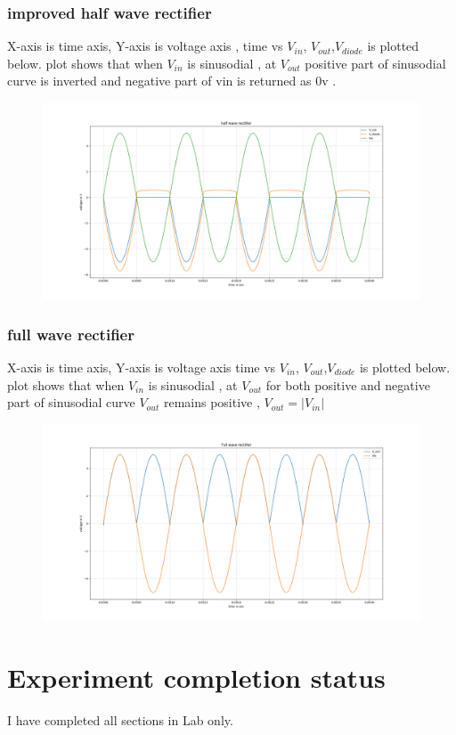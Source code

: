 \documentclass[12pt]{article}
\begin{document}
\subsubsection{improved half wave rectifier}
X-axis is time axis, Y-axis is voltage axis , time vs \(V_{in}\), \(V_{out}\),\(V_{diode}\) is plotted below. plot shows that when \(V_{in}\) is sinusodial , at \(V_{out}\) positive part of sinusodial curve is inverted and negative part of vin is returned as 0v .\\
\begin{figure}[h!]
\centering
\includegraphics[scale = 0.4]{improved_half_wave_rectifier_plot.png}
\end{figure}
\newpage

\subsubsection{ full wave rectifier}
X-axis is time axis, Y-axis is voltage axis time vs \(V_{in}\), \(V_{out}\),\(V_{diode}\) is plotted below.  plot shows that when \(V_{in}\) is sinusodial , at \(V_{out}\) for both positive and negative part of sinusodial curve \(V_{out}\) remains positive , \(V_{out}=|V_{in}|\)
\begin{figure}[h!]
\centering
\includegraphics[scale = 0.4]{full_wave_rectifier_plot.png}
\end{figure}
\newpage

\section{Experiment completion status}
I have completed all sections in Lab only.
\end{document}
